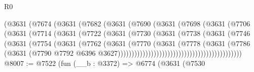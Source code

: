 \begin{lexlean}{R0}
\begin{coremodule}
                              (@3631
                                (@7674
                                  (@3631
                                    (@7682
                                      (@3631
                                        (@7690
                                          (@3631
                                            (@7698
                                              (@3631
                                                (@7706
                                                  (@3631
                                                    (@7714
                                                      (@3631
                                                        (@7722
                                                          (@3631
                                                            (@7730
                                                              (@3631
                                                                (@7738
                                                                  (@3631
                                                                    (@7746
                                                                      (@3631
                                                                        (@7754
                                                                          (@3631
                                                                            (@7762
                                                                              (@3631
                                                                                (@7770
                                                                                  (@3631
                                                                                    (@7778
                                                                                      (@3631
                                                                                        (@7786
                                                                                          (@3631
                                                                                            (@7790
                                                                                              @7792
                                                                                              @6396
                                                                                              @3627)))))))))))))))))))))))))))))))))))))))))))))
@8007 := @7522
    (fun (__b : @3372) =>
    @6774
      (@3631
        (@7530

\end{coremodule}
\end{lexlean}
